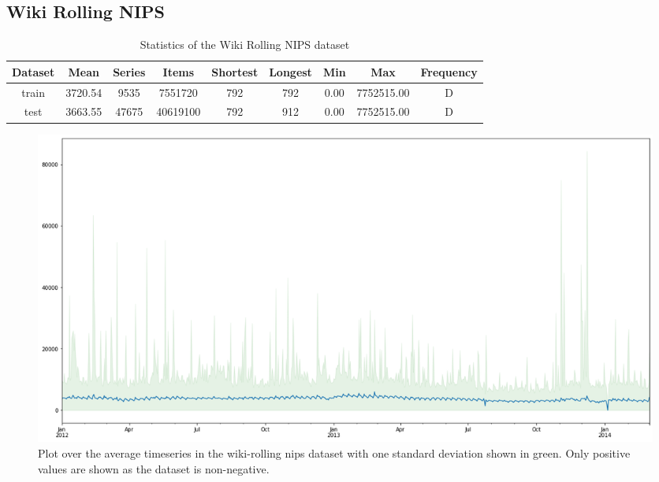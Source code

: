 \subsection{Wiki Rolling NIPS}

\begin{table}[htb]
  \begin{tabular}{||c | c c c c c c c c ||}
    \hline
    Dataset & Mean    & Series & Items    & Shortest & Longest & Min  & Max        & Frequency \\ [0.5ex]
    \hline\hline
    train   & 3720.54 & 9535   & 7551720  & 792      & 792     & 0.00 & 7752515.00 & D         \\
    \hline
    test    & 3663.55 & 47675  & 40619100 & 792      & 912     & 0.00 & 7752515.00 & D         \\
    \hline
  \end{tabular}
  \caption{Statistics of the Wiki Rolling NIPS dataset}
\end{table}


\begin{figure}[htb]
  \centering
  \includegraphics[width=\linewidth]{./img/wiki-rolling_nips_plot.png}
  \caption{Plot over the average timeseries in the wiki-rolling nips dataset with one standard deviation shown in green. Only positive values are shown as the dataset is non-negative.}
  \label{fig:wiki-rolling_nips_plot}
  \endminipage\hfill
\end{figure}

